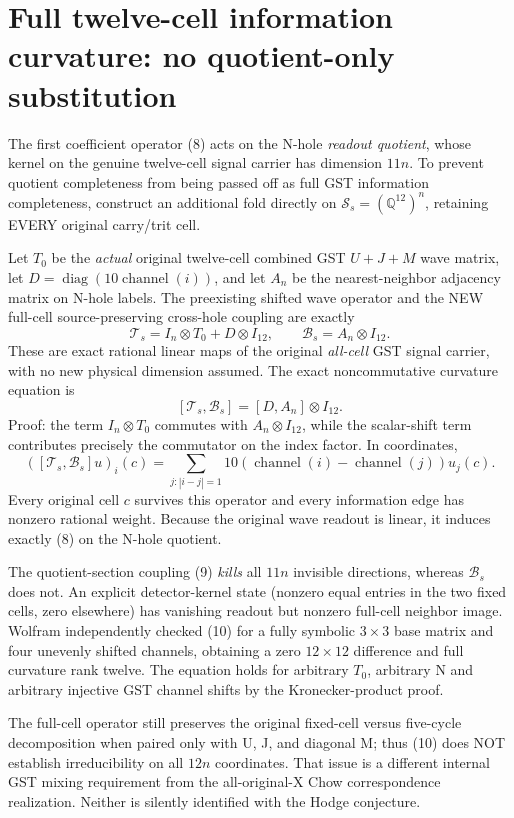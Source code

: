 \documentclass[11pt]{article}
\newcommand{\Q}{\mathbb Q}
\begin{document}
\section{Full twelve-cell information curvature: no quotient-only substitution}
The first coefficient operator (8) acts on the N-hole \emph{readout quotient}, whose
kernel on the genuine twelve-cell signal carrier has dimension $11n$.
To prevent quotient completeness from being passed off as full GST information
completeness, construct an additional fold directly on
\(\mathscr S_s=(\Q^{12})^n\), retaining EVERY original carry/trit cell.

Let $T_0$ be the \emph{actual} original twelve-cell combined GST
$U+J+M$ wave matrix, let \(D=\operatorname{diag}(10\operatorname{channel}(i))\),
and let \(A_n\) be the nearest-neighbor adjacency matrix on N-hole labels.
The preexisting shifted wave operator and the NEW full-cell source-preserving
cross-hole coupling are exactly
\[
 \mathcal T_s=I_n\otimes T_0+D\otimes I_{12},\qquad
 \mathcal B_s=A_n\otimes I_{12}.
\]
These are exact rational linear maps of the original \emph{all-cell} GST
signal carrier, with no new physical dimension assumed. The exact
noncommutative curvature equation is
\[
 \boxed{
 [\mathcal T_s,\mathcal B_s]
   =[D,A_n]\otimes I_{12}.
 }\tag{10}
\]
Proof: the term $I_n\otimes T_0$ commutes with $A_n\otimes I_{12}$,
while the scalar-shift term contributes precisely the commutator on
the index factor. In coordinates,
\[
 ([\mathcal T_s,\mathcal B_s]u)_i(c)
 =\sum_{j:|i-j|=1}10
   (\operatorname{channel}(i)-\operatorname{channel}(j))u_j(c).
\]
Every original cell $c$ survives this operator and every information
edge has nonzero rational weight. Because the original wave readout is
linear, it induces exactly (8) on the N-hole quotient.

The quotient-section coupling (9) \emph{kills} all $11n$ invisible
directions, whereas $\mathcal B_s$ does not. An explicit detector-kernel
state (nonzero equal entries in the two fixed cells, zero elsewhere)
has vanishing readout but nonzero full-cell neighbor image. Wolfram
independently checked (10) for a fully symbolic $3\times3$ base
matrix and four unevenly shifted channels, obtaining a zero
$12\times12$ difference and full curvature rank twelve. The equation
holds for arbitrary $T_0$, arbitrary N and arbitrary injective GST
channel shifts by the Kronecker-product proof.

The full-cell operator still preserves the original fixed-cell versus
five-cycle decomposition when paired only with U, J, and diagonal M;
thus (10) does NOT establish irreducibility on all $12n$ coordinates.
That issue is a different internal GST mixing requirement from the
all-original-X Chow correspondence realization. Neither is silently
identified with the Hodge conjecture.
\end{document}
